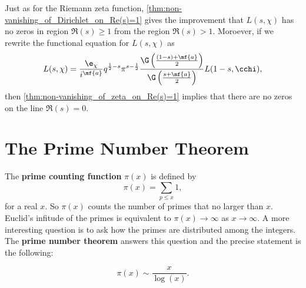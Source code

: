       Just as for the Riemann zeta function, \cref{thm:non-vanishing_of_Dirichlet_on_Re(s)=1} gives the improvement that $L(s,\chi)$ has no zeros in region $\Re(s) \ge 1$ from the region $\Re(s) > 1$. Moroever, if we rewrite the functional equation for $L(s,\chi)$ as
      \[
        L(s,\chi) = \frac{\e_{\chi}}{i^{\mf{a}}}q^{\frac{1}{2}-s}\pi^{s-\frac{1}{2}}\frac{\G\left(\frac{(1-s)+\mf{a}}{2}\right)}{\G\left(\frac{s+\mf{a}}{2}\right)}L(1-s,\cchi),
      \]
      then \cref{thm:non-vanishing_of_zeta_on_Re(s)=1} implies that there are no zeros on the line $\Re(s) = 0$.
    \section{The Prime Number Theorem}
      The \textbf{prime counting function} $\pi(x)$ is defined by
      \[
        \pi(x) = \sum_{p \le x}1,
      \]
      for a real $x$. So $\pi(x)$ counts the number of primes that no larger than $x$. Euclid's infitude of the primes is equivalent to $\pi(x) \to \infty$ as $x \to \infty$. A more interesting question is to ask how the primes are distributed among the integers. The \textbf{prime number theorem} answers this question and the precise statement is the following:

      \begin{theorem}
        \phantom{ }
        \[
          \pi(x) \sim \frac{x}{\log(x)}.
        \]
      \end{theorem}

